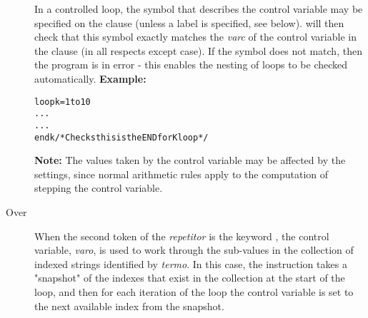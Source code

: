 \begin{description}
In a controlled loop, the symbol that describes the control variable may
be specified on the  clause (unless a label is specified,
see below).
\nr{} will then check that this symbol exactly matches the
\emph{varc} of the control variable in the  clause (in
all respects except case).
If the symbol does not match, then the program is in error - this
enables the nesting of loops to be checked automatically.
 \textbf{Example:}
\begin{alltt}
loop k=1 to 10
  ...
  ...
  end k  /* Checks this is the END for K loop */
\end{alltt}
\textbf{Note: }The values taken by the control variable may be affected by the
 settings, since normal \nr{} arithmetic rules apply
to the computation of stepping the control variable.
\item[Over]\label{refloopov}

When the second token of the \emph{repetitor} is the keyword
, the control variable, \emph{varo}, is used
to work through the sub-values in the collection of indexed strings
identified by \emph{termo}.
In this case, the  instruction takes a "snapshot" of
the indexes that exist in the collection at the start of the loop, and
then for each iteration of the loop the control variable is set to the
next available index from the snapshot.
 

\end{description}
